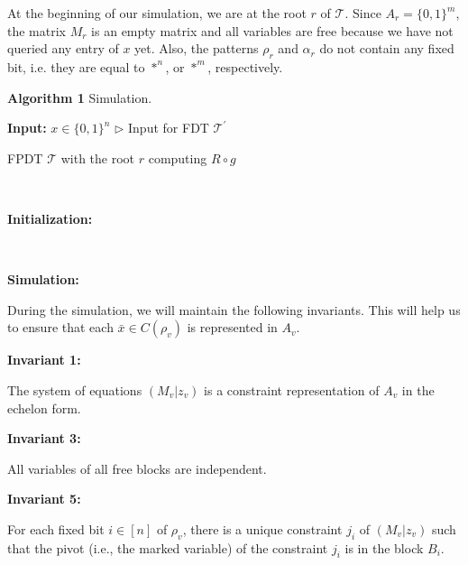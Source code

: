 \documentclass[10pt,a4paper]{article}
\begin{document}
At the beginning of our simulation, we are at the root $r$ of $\mathcal{T}$.
Since $A_{r}=\{0,1\}^{m}$, the matrix $M_{r}$ is an empty matrix and all variables are free because we have not queried any entry of $x$ yet.
Also, the patterns $\rho_{r}$ and $\alpha_{r}$ do not contain any fixed bit, i.e. they are equal to $*^{n}$, or $*^{m}$, respectively.\par




\textbf{Algorithm 1}  Simulation.


\textbf{Input:} $x\in\{0,1\}^{n}$  $\triangleright$ Input for FDT $\mathcal{T}^{\prime}$\par





FPDT $\mathcal{T}$ with the root $r$ computing $R\circ g$\par



 



\textbf{Initialization:}\par





 



\textbf{Simulation:}\par








During the simulation, we will maintain the following invariants.
This will help us to ensure that each $\bar{x}\in C(\rho_{v})$ is represented in $A_{v}$.\par


\textbf{ Invariant 1:}



The system of equations $(M_{v}|z_{v})$ is a constraint representation of $A_{v}$ in the echelon form.\par



\textbf{ Invariant 3:}



All variables of all free blocks are independent.\par



\textbf{ Invariant 5:}



For each fixed bit $i\in[n]$ of $\rho_{v}$, there is a unique constraint $j_{i}$ of $(M_{v}|z_{v})$ such that the pivot (i.e., the marked variable) of the constraint $j_{i}$ is in the block $B_{i}$.\par
\end{document}
